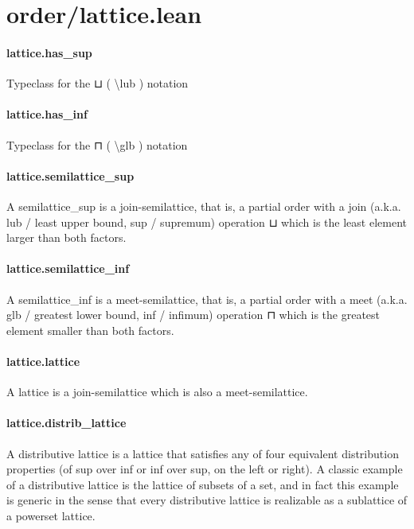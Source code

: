 \documentclass{article}
\begin{document}
\section{order/lattice.lean}\paragraph{lattice.has\_sup}
\par
Typeclass for the 
\colorbox[RGB]{253,246,227}{{{{\color[RGB]{101, 123, 131} ⊔ }}}} (
\colorbox[RGB]{253,246,227}{{{{\color[RGB]{101, 123, 131} \textbackslash{}lub }}}}) notation
\paragraph{lattice.has\_inf}
\par
Typeclass for the 
\colorbox[RGB]{253,246,227}{{{{\color[RGB]{101, 123, 131} ⊓ }}}} (
\colorbox[RGB]{253,246,227}{{{{\color[RGB]{101, 123, 131} \textbackslash{}glb }}}}) notation
\paragraph{lattice.semilattice\_sup}
\par
A 
\colorbox[RGB]{253,246,227}{{{{\color[RGB]{101, 123, 131} semilattice\_sup }}}} is a join-semilattice, that is, a partial order
with a join (a.k.a. lub / least upper bound, sup / supremum) operation
\colorbox[RGB]{253,246,227}{{{{\color[RGB]{101, 123, 131} ⊔ }}}} which is the least element larger than both factors.
\paragraph{lattice.semilattice\_inf}
\par
A 
\colorbox[RGB]{253,246,227}{{{{\color[RGB]{101, 123, 131} semilattice\_inf }}}} is a meet-semilattice, that is, a partial order
with a meet (a.k.a. glb / greatest lower bound, inf / infimum) operation
\colorbox[RGB]{253,246,227}{{{{\color[RGB]{101, 123, 131} ⊓ }}}} which is the greatest element smaller than both factors.
\paragraph{lattice.lattice}
\par
A lattice is a join-semilattice which is also a meet-semilattice.
\paragraph{lattice.distrib\_lattice}
\par
A distributive lattice is a lattice that satisfies any of four
equivalent distribution properties (of sup over inf or inf over sup,
on the left or right). A classic example of a distributive lattice
is the lattice of subsets of a set, and in fact this example is
generic in the sense that every distributive lattice is realizable
as a sublattice of a powerset lattice.
\end{document}

